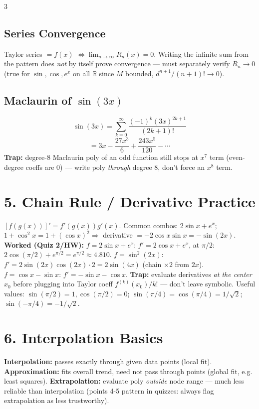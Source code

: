 \documentclass[9pt]{extarticle}
\newcommand{\hl}[1]{\textbf{\textcolor{BrickRed}{#1}}}
\begin{document}
\begin{multicols}{3}
\subsection{Series Convergence}
Taylor series $=f(x)$ $\iff \lim_{n\to\infty}R_n(x)=0$. Writing the infinite sum from the pattern does \emph{not} by itself prove convergence — must separately verify $R_n\to0$ (true for $\sin,\cos,e^x$ on all $\mathbb R$ since $M$ bounded, $d^{n+1}/(n+1)!\to0$).

\subsection{Maclaurin of $\sin(3x)$}
\begin{equation*}
\sin(3x)=\sum_{k=0}^{\infty}\frac{(-1)^k (3x)^{2k+1}}{(2k+1)!}
\end{equation*}
\begin{equation*}
=3x-\frac{27x^3}{6}+\frac{243x^5}{120}-\cdots
\end{equation*}
\hl{Trap:} degree-8 Maclaurin poly of an odd function still stops at $x^7$ term (even-degree coeffs are 0) — write poly \emph{through} degree 8, don't force an $x^8$ term.

\section{5. Chain Rule / Derivative Practice}
$[f(g(x))]'=f'(g(x))g'(x)$. Common combos: $2\sin x+e^x$; $1+\cos^2 x=1+(\cos x)^2\Rightarrow$ derivative $=-2\cos x\sin x=-\sin(2x)$.
\hl{Worked (Quiz 2/HW):} $f=2\sin x+e^x$: $f'=2\cos x+e^x$, at $\pi/2$: $2\cos(\pi/2)+e^{\pi/2}=e^{\pi/2}\approx4.810$. $f=\sin^2(2x)$: $f'=2\sin(2x)\cos(2x)\cdot2=2\sin(4x)$ (chain $\times2$ from $2x$). $f=\cos x-\sin x$: $f'=-\sin x-\cos x$.
\hl{Trap:} evaluate derivatives \emph{at the center} $x_0$ before plugging into Taylor coeff $f^{(k)}(x_0)/k!$ — don't leave symbolic.
Useful values: $\sin(\pi/2)=1,\cos(\pi/2)=0$; $\sin(\pi/4)=\cos(\pi/4)=1/\sqrt2$; $\sin(-\pi/4)=-1/\sqrt2$.

\section{6. Interpolation Basics}
\hl{Interpolation:} passes exactly through given data points (local fit). \hl{Approximation:} fits overall trend, need not pass through points (global fit, e.g. least squares). \hl{Extrapolation:} evaluate poly \emph{outside} node range — much less reliable than interpolation (points 4-5 pattern in quizzes: always flag extrapolation as less trustworthy).


\end{multicols}
\end{document}
